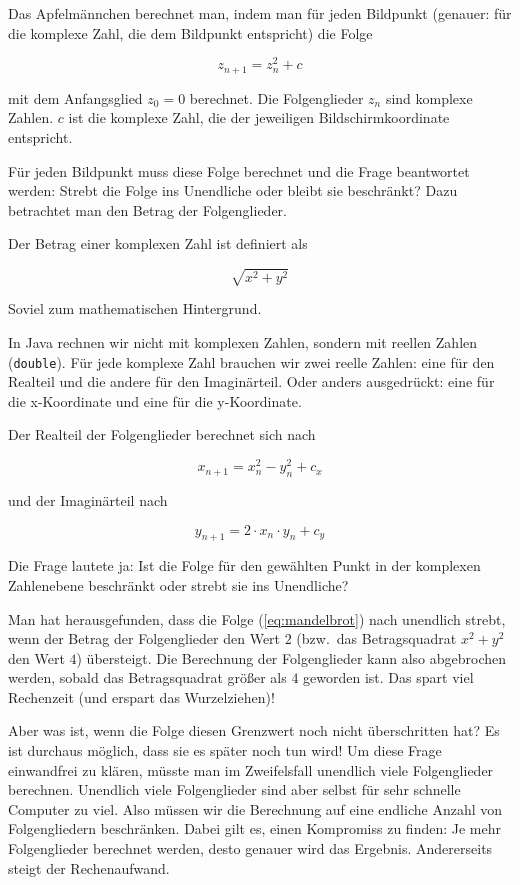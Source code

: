 Das Apfelmännchen berechnet man, indem man für jeden Bildpunkt (genauer: für
die komplexe Zahl, die dem Bildpunkt entspricht) die Folge

\begin{equation}
z_{n+1} = z_n^2 + c
\label{eq:mandelbrot}
\end{equation}

mit dem Anfangsglied $z_0 = 0$ berechnet. Die Folgenglieder $z_n$ sind
komplexe Zahlen. $c$ ist die komplexe Zahl, die der jeweiligen
Bildschirmkoordinate entspricht.

Für jeden Bildpunkt muss diese Folge berechnet und die Frage beantwortet
werden: Strebt die Folge ins Unendliche oder bleibt sie beschränkt? Dazu
betrachtet man den Betrag der Folgenglieder.

Der Betrag einer komplexen Zahl ist definiert als

\[
\sqrt{x^2 + y^2}
\]

Soviel zum mathematischen Hintergrund.

In Java rechnen wir nicht mit komplexen Zahlen, sondern mit reellen Zahlen
(\lstinline|double|). Für jede komplexe Zahl brauchen wir zwei reelle Zahlen:
eine für den Realteil und die andere für den Imaginärteil. Oder anders
ausgedrückt: eine für die x-Koordinate und eine für die y-Koordinate.

Der Realteil der Folgenglieder berechnet sich nach

\[
x_{n+1} = x_n^2 - y_n^2 + c_x
\]

und der Imaginärteil nach

\[
y_{n+1} = 2 \cdot x_n \cdot y_n + c_y
\]

Die Frage lautete ja: Ist die Folge für den gewählten Punkt in der komplexen
Zahlenebene beschränkt oder strebt sie ins Unendliche? 

Man hat herausgefunden, dass die Folge (\ref{eq:mandelbrot}) nach unendlich strebt, wenn
der Betrag der Folgenglieder den Wert $2$ (bzw.\ das Betragsquadrat $x^2 + y^2$
den Wert $4$) übersteigt. Die Berechnung der Folgenglieder kann also
abgebrochen werden, sobald das Betragsquadrat größer als $4$ geworden ist. Das
spart viel Rechenzeit (und erspart das Wurzelziehen)!

Aber was ist, wenn die Folge diesen Grenzwert noch nicht überschritten hat? Es
ist durchaus möglich, dass sie es später noch tun wird! Um diese Frage
einwandfrei zu klären, müsste man im Zweifelsfall unendlich viele Folgenglieder
berechnen. Unendlich viele Folgenglieder sind aber selbst für sehr schnelle
Computer zu viel. Also müssen wir die Berechnung auf eine endliche Anzahl von
Folgengliedern beschränken. Dabei gilt es, einen Kompromiss zu finden: Je mehr
Folgenglieder berechnet werden, desto genauer wird das Ergebnis. Andererseits
steigt der Rechenaufwand.

